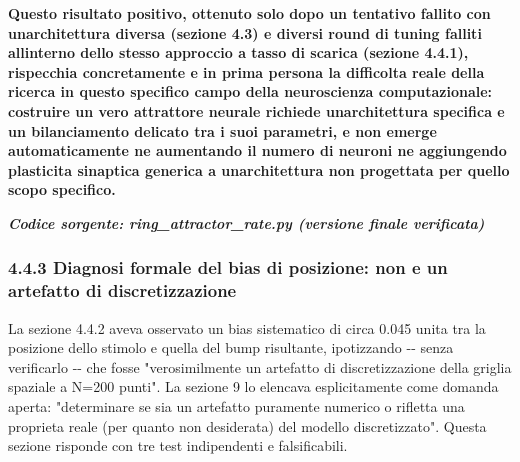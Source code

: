 \documentclass[
  italian,
]{article}
\begin{document}
\textbf{Questo risultato positivo, ottenuto solo dopo un tentativo fallito con un\textquotesingle architettura diversa (sezione 4.3) e diversi round di tuning falliti all\textquotesingle interno dello stesso approccio a tasso di scarica (sezione 4.4.1), rispecchia concretamente e in prima persona la difficolta\textquotesingle{} reale della ricerca in questo specifico campo della neuroscienza computazionale: costruire un vero attrattore neurale richiede un\textquotesingle architettura specifica e un bilanciamento delicato tra i suoi parametri, e non emerge automaticamente ne\textquotesingle{} aumentando il numero di neuroni ne\textquotesingle{} aggiungendo plasticita\textquotesingle{} sinaptica generica a un\textquotesingle architettura non progettata per quello scopo specifico.}

\textit{\textbf{Codice sorgente: ring\_\allowbreak{}attractor\_\allowbreak{}rate.py (versione finale verificata)}}


\subsubsection{4.4.3 Diagnosi formale del bias di posizione: non e\textquotesingle{} un artefatto di discretizzazione}\label{diagnosi-formale-del-bias-di-posizione-non-e-un-artefatto-di-discretizzazione}

La sezione 4.4.2 aveva osservato un bias sistematico di circa 0.045 unita\textquotesingle{} tra la posizione dello stimolo e quella del bump risultante, ipotizzando -\/- senza verificarlo -\/- che fosse "verosimilmente un artefatto di discretizzazione della griglia spaziale a N=200 punti". La sezione 9 lo elencava esplicitamente come domanda aperta: "determinare se sia un artefatto puramente numerico o rifletta una proprieta\textquotesingle{} reale (per quanto non desiderata) del modello discretizzato". Questa sezione risponde con tre test indipendenti e falsificabili.
\end{document}
